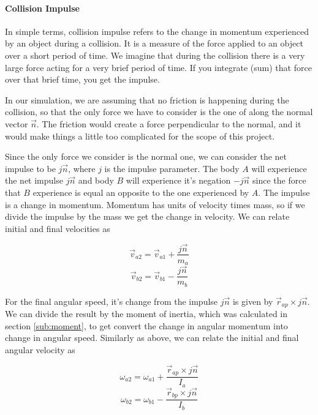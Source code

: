 \paragraph{Collision Impulse} In simple terms, collision impulse refers to the
change in momentum experienced by an object during a collision. It is a measure
of the force applied to an object over a short period of time. We imagine that
during the collision there is a very large force acting for a very brief period
of time. If you integrate (sum) that force over that brief time, you get the
impulse.

In our simulation, we are assuming that no friction is happening during the
collision, so that the only force we have to consider is the one of along the
normal vector $\vec n$. The friction would create a force perpendicular to the
normal, and it would make things a little too complicated for the scope of this
project.

Since the only force we consider is the normal one, we can consider the net
impulse to be $j \vec n$, where $j$ is the impulse parameter. The body $A$ will
experience the net impulse $j \vec n$ and body $B$ will experience it's negation
$- j \vec n$ since the force that $B$ experience is equal an opposite to the one
experienced by $A$. The impulse is a change in momentum. Momentum has units of
velocity times mass, so if we divide the impulse by the mass we get the change
in velocity. We can relate initial and final velocities as

\begin{equation}
	\label{eq:va2}
	\vec v_{a2} = \vec v_{a1} +  \frac{j\vec n}{m_a}
\end{equation}
\begin{equation}
	\label{eq:vb2}
	\vec v_{b2} = \vec v_{b1} -  \frac{j\vec n}{m_b}
\end{equation}


For the final angular speed, it's change from the impulse $j\vec n$ is given by
$\vec r_{ap} \times j \vec n$. We can divide the result by the moment of
inertia, which was calculated in section \ref{sub:moment}, to get convert the
change in angular momentum into change in angular speed. Similarly as above, we
can relate the initial and final angular velocity as

\begin{equation}
	\label{eq:omega_a2}
	\omega_{a2} = \omega_{a1} + \frac{\vec r_{ap} \times j\vec n}{I_a}
\end{equation}
\begin{equation}
	\label{eq:omega_b2}
	\omega_{b2} = \omega_{b1} - \frac{\vec r_{bp} \times j\vec n}{I_b}
\end{equation}

